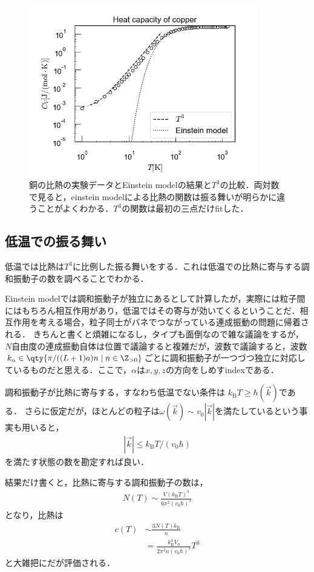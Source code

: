	\begin{figure}[H]
			\centering
			\includegraphics[width=10cm]{./img/einstein_logcompare.png}
			\caption{銅の比熱の実験データとEinstein modelの結果と$T^3$の比較．両対数で見ると，einstein modelによる比熱の関数は振る舞いが明らかに違うことがよくわかる．$T^3$の関数は最初の三点だけfitした．}
			\label{fig:einstein_log}
	\end{figure}
	\subsection{低温での振る舞い}
	低温では比熱は$T^3$に比例した振る舞いをする．これは低温での比熱に寄与する調和振動子の数を調べることでわかる．

	Einstein modelでは調和振動子が独立にあるとして計算したが，実際には粒子間にはもちろん相互作用があり，低温ではその寄与が効いてくるということだ．相互作用を考える場合，粒子同士がバネでつながっている連成振動の問題に帰着される．
	きちんと書くと煩雑になるし，タイプも面倒なので雑な議論をするが，$N$自由度の連成振動自体は位置で議論すると複雑だが，波数で議論すると，波数$k_{\alpha}\in\qty{\pi/ ((L+1)a)n\mid n\in \Z_{>0}}$ごとに調和振動子が一つづつ独立に対応しているものだと思える．ここで，$\alpha$は$x, y, z$の方向をしめすindexである．

	調和振動子が比熱に寄与する，すなわち低温でない条件は
	$k_{\text{B}}T \geq \hbar(\vec{k})$である．
	さらに仮定だが，ほとんどの粒子は$\omega(\vec{k})\sim v_0|\vec{k}|$を満たしているという事実も用いると，
	\begin{align}
			|\vec{k}| \leq k_{\text{B}} T / (v_0\hbar) \label{eq:T3wavelen}
	\end{align}
	を満たす状態の数を勘定すれば良い．

	結果だけ書くと，比熱に寄与する調和振動子の数は，
	\begin{align}
			N(T) \sim \frac{V(k_{\text{B}}T)^3}{6\pi^2 (v_0\hbar)^3}\label{eq:T3statenum}
	\end{align}
	となり，比熱は
	\begin{align}
			c(T) 
			&\sim \frac{3N(T)k_{\text{B}}}{n}\\
			&= \frac{k_{\text{B}}^4 V_0}{2\pi^2 n (v_0\hbar)^3}T^3
	\end{align}
	と大雑把にだが評価される．


